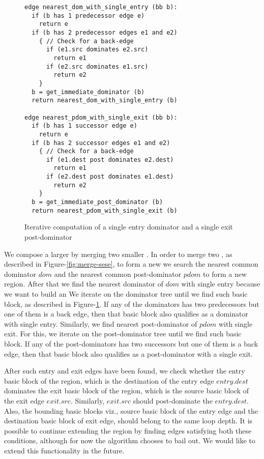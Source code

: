 \documentclass{sig-alternate}
\begin{document}
\begin{figure}
\begin{verbatim}
edge nearest_dom_with_single_entry (bb b):
  if (b has 1 predecessor edge e)
    return e
  if (b has 2 predecessor edges e1 and e2)
    { // Check for a back-edge
      if (e1.src dominates e2.src)
        return e1
      if (e2.src dominates e1.src)
        return e2
    }
  b = get_immediate_dominator (b)
  return nearest_dom_with_single_entry (b)

edge nearest_pdom_with_single_exit (bb b):
  if (b has 1 successor edge e)
    return e
  if (b has 2 successor edges e1 and e2)
    { // Check for a back-edge
      if (e1.dest post dominates e2.dest)
        return e1
      if (e2.dest post dominates e1.dest)
        return e2
    }
  b = get_immediate_post_dominator (b)
  return nearest_pdom_with_single_exit (b)
\end{verbatim}
\caption{Iterative computation of a single entry dominator and a single exit
  post-dominator}
\label{fig:iterate-single-entry}
\end{figure}

We compose a larger \SESE{} by merging two smaller . In order to merge two
, as described in Figure-\ref{fig:merge-sese}, to form a new \SESE{,} we
search the nearest common dominator $dom$ and the nearest common post-dominator
$pdom$ to form a new region.  After that we find the nearest dominator of $dom$
with single entry because we want to build an   We iterate on the dominator
tree until we find such basic block, as described in
Figure-\ref{fig:iterate-single-entry}.  If any of the dominators has two
predecessors but one of them is a back edge, then that basic block also
qualifies as a dominator with single entry.  Similarly, we find nearest
post-dominator of $pdom$ with single exit.  For this, we iterate on the
post-dominator tree until we find such basic block.  If any of the
post-dominators has two successors but one of them is a back edge, then that
basic block also qualifies as a post-dominator with a single exit.

After such entry and exit edges have been found, we check whether the entry
basic block of the region, which is the destination of the entry edge
$entry.dest$ dominates the exit basic block of the region, which is the source
basic block of the exit edge $exit.src$.  Similarly, $exit.src$ should
post-dominate the $entry.dest$.  Also, the bounding basic blocks viz., source
basic block of the entry edge and the destination basic block of exit edge,
should belong to the same loop depth.  It is possible to continue extending the
region by finding edges satisfying both these conditions, although for now the
algorithm chooses to bail out.  We would like to extend this functionality in the
future.
\end{document}
